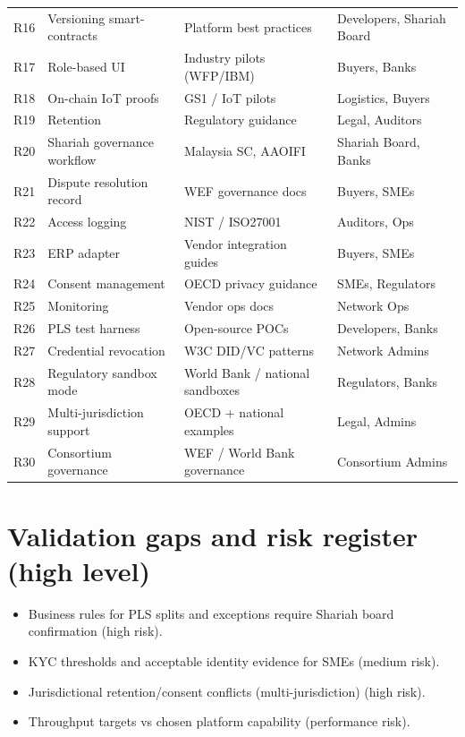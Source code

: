 \documentclass[11pt,a4paper]{article}
\begin{document}
\begin{longtable}{p{} p{} p{} p{}}
R16 & Versioning smart-contracts & Platform best practices & Developers, Shariah Board \\
R17 & Role-based UI & Industry pilots (WFP/IBM) & Buyers, Banks \\
R18 & On-chain IoT proofs & GS1 / IoT pilots & Logistics, Buyers \\
R19 & Retention & Regulatory guidance & Legal, Auditors \\
R20 & Shariah governance workflow & Malaysia SC, AAOIFI & Shariah Board, Banks \\
R21 & Dispute resolution record & WEF governance docs & Buyers, SMEs \\
R22 & Access logging & NIST / ISO27001 & Auditors, Ops \\
R23 & ERP adapter & Vendor integration guides & Buyers, SMEs \\
R24 & Consent management & OECD privacy guidance & SMEs, Regulators \\
R25 & Monitoring & Vendor ops docs & Network Ops \\
R26 & PLS test harness & Open-source POCs & Developers, Banks \\
R27 & Credential revocation & W3C DID/VC patterns & Network Admins \\
R28 & Regulatory sandbox mode & World Bank / national sandboxes & Regulators, Banks \\
R29 & Multi-jurisdiction support & OECD + national examples & Legal, Admins \\
R30 & Consortium governance & WEF / World Bank governance & Consortium Admins \\
\bottomrule
\end{longtable}

\section{Validation gaps and risk register (high level)}
\begin{itemize}
\item Business rules for PLS splits and exceptions require Shariah board confirmation (high risk).\
\item KYC thresholds and acceptable identity evidence for SMEs (medium risk).\
\item Jurisdictional retention/consent conflicts (multi-jurisdiction) (high risk).\
\item Throughput targets vs chosen platform capability (performance risk).\
\end{itemize}
\end{document}
